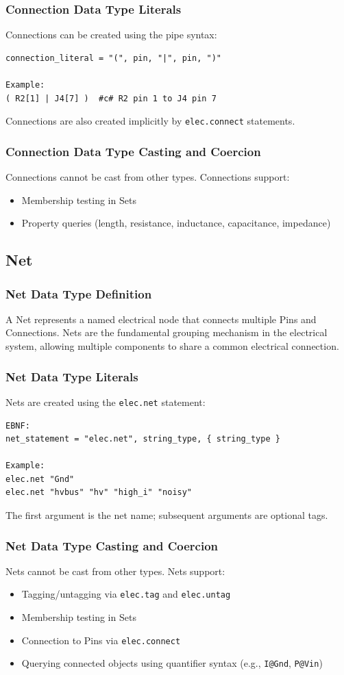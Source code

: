 \documentclass{report}
\begin{document}
\subsubsection{Connection Data Type Literals}
Connections can be created using the pipe syntax:
\begin{verbatim}
connection_literal = "(", pin, "|", pin, ")"

Example:
( R2[1] | J4[7] )  #c# R2 pin 1 to J4 pin 7
\end{verbatim}
Connections are also created implicitly by \texttt{elec.connect} statements.
\subsubsection{Connection Data Type Casting and Coercion}
Connections cannot be cast from other types. Connections support:
\begin{itemize}
\item Membership testing in Sets
\item Property queries (length, resistance, inductance, capacitance, impedance)
\end{itemize}
\subsection{Net}
\subsubsection{Net Data Type Definition}
A Net represents a named electrical node that connects multiple Pins and Connections. Nets are the fundamental grouping mechanism in the electrical system, allowing multiple components to share a common electrical connection.
\subsubsection{Net Data Type Literals}
Nets are created using the \texttt{elec.net} statement:
\begin{verbatim}
EBNF:
net_statement = "elec.net", string_type, { string_type }

Example:
elec.net "Gnd"
elec.net "hvbus" "hv" "high_i" "noisy"
\end{verbatim}
The first argument is the net name; subsequent arguments are optional tags.
\subsubsection{Net Data Type Casting and Coercion}
Nets cannot be cast from other types. Nets support:
\begin{itemize}
\item Tagging/untagging via \texttt{elec.tag} and \texttt{elec.untag}
\item Membership testing in Sets
\item Connection to Pins via \texttt{elec.connect}
\item Querying connected objects using quantifier syntax (e.g., \texttt{I@Gnd}, \texttt{P@Vin})
\end{itemize}
\end{document}
